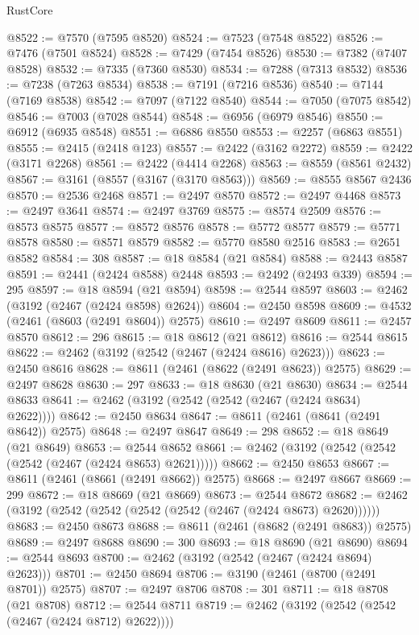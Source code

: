 \begin{lexlean}{RustCore}
\begin{coremodule}
@8522 := @7570 (@7595 @8520)
@8524 := @7523 (@7548 @8522)
@8526 := @7476 (@7501 @8524)
@8528 := @7429 (@7454 @8526)
@8530 := @7382 (@7407 @8528)
@8532 := @7335 (@7360 @8530)
@8534 := @7288 (@7313 @8532)
@8536 := @7238 (@7263 @8534)
@8538 := @7191 (@7216 @8536)
@8540 := @7144 (@7169 @8538)
@8542 := @7097 (@7122 @8540)
@8544 := @7050 (@7075 @8542)
@8546 := @7003 (@7028 @8544)
@8548 := @6956 (@6979 @8546)
@8550 := @6912 (@6935 @8548)
@8551 := @6886 @8550
@8553 := @2257 (@6863 @8551)
@8555 := @2415 (@2418 @123)
@8557 := @2422 (@3162 @2272)
@8559 := @2422 (@3171 @2268)
@8561 := @2422 (@4414 @2268)
@8563 := @8559 (@8561 @2432)
@8567 := @3161 (@8557 (@3167 (@3170 @8563)))
@8569 := @8555 @8567 @2436
@8570 := @2536 @2468
@8571 := @2497 @8570
@8572 := @2497 @4468
@8573 := @2497 @3641
@8574 := @2497 @3769
@8575 := @8574 @2509
@8576 := @8573 @8575
@8577 := @8572 @8576
@8578 := @5772 @8577
@8579 := @5771 @8578
@8580 := @8571 @8579
@8582 := @5770 @8580 @2516
@8583 := @2651 @8582
@8584 := 308
@8587 := @18 @8584 (@21 @8584)
@8588 := @2443 @8587
@8591 := @2441 (@2424 @8588) @2448
@8593 := @2492 (@2493 @339)
@8594 := 295
@8597 := @18 @8594 (@21 @8594)
@8598 := @2544 @8597
@8603 := @2462 (@3192 (@2467 (@2424 @8598) @2624))
@8604 := @2450 @8598
@8609 := @4532 (@2461 (@8603 (@2491 @8604)) @2575)
@8610 := @2497 @8609
@8611 := @2457 @8570
@8612 := 296
@8615 := @18 @8612 (@21 @8612)
@8616 := @2544 @8615
@8622 := @2462 (@3192 (@2542 (@2467 (@2424 @8616) @2623)))
@8623 := @2450 @8616
@8628 := @8611 (@2461 (@8622 (@2491 @8623)) @2575)
@8629 := @2497 @8628
@8630 := 297
@8633 := @18 @8630 (@21 @8630)
@8634 := @2544 @8633
@8641 := @2462 (@3192 (@2542 (@2542 (@2467 (@2424 @8634) @2622))))
@8642 := @2450 @8634
@8647 := @8611 (@2461 (@8641 (@2491 @8642)) @2575)
@8648 := @2497 @8647
@8649 := 298
@8652 := @18 @8649 (@21 @8649)
@8653 := @2544 @8652
@8661 := @2462 (@3192 (@2542 (@2542 (@2542 (@2467 (@2424 @8653) @2621)))))
@8662 := @2450 @8653
@8667 := @8611 (@2461 (@8661 (@2491 @8662)) @2575)
@8668 := @2497 @8667
@8669 := 299
@8672 := @18 @8669 (@21 @8669)
@8673 := @2544 @8672
@8682 := @2462 (@3192 (@2542 (@2542 (@2542 (@2542 (@2467 (@2424 @8673) @2620))))))
@8683 := @2450 @8673
@8688 := @8611 (@2461 (@8682 (@2491 @8683)) @2575)
@8689 := @2497 @8688
@8690 := 300
@8693 := @18 @8690 (@21 @8690)
@8694 := @2544 @8693
@8700 := @2462 (@3192 (@2542 (@2467 (@2424 @8694) @2623)))
@8701 := @2450 @8694
@8706 := @3190 (@2461 (@8700 (@2491 @8701)) @2575)
@8707 := @2497 @8706
@8708 := 301
@8711 := @18 @8708 (@21 @8708)
@8712 := @2544 @8711
@8719 := @2462 (@3192 (@2542 (@2542 (@2467 (@2424 @8712) @2622))))

\end{coremodule}
\end{lexlean}
